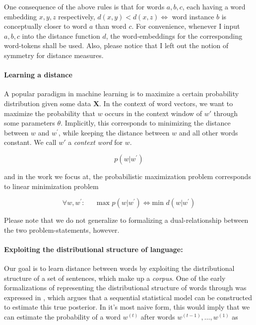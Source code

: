 \documentclass[a4paper,12pt,twoside,openright]{report}
\begin{document}
One consequence of the above rules is that for words $a, b, c$, each having a word embedding $x, y, z$ respectively, $d(x, y) < d(x, z) \iff $ word instance $b$ is conceptually closer to word $a$ than word $c$.
For convenience, whenever I input $a, b, c$ into the distance function $d$, the word-embeddings for the corresponding word-tokens shall be used.
Also, please notice that I left out the notion of symmetry for distance measures.

\paragraph{Learning a distance}
A popular paradigm in machine learning is to maximize a certain probability distribution given some data $\mathbf{X}$.
In the context of word vectors, we want to maximize the probability that $w$ occurs in the context window of $w \prime$ through some parameters $\theta$.
Implicitly, this corresponds to minimizing the distance between $w$ and $w^{\prime}$, while keeping the distance between $w$ and all other words constant. 
We call $w \prime$ a \textit{context word} for $w$.

\begin{equation}
p \left(w | w^{\prime}\right)
\end{equation}

and in the work we focus at, the probabilistic maximization problem corresponds to linear minimization problem

\begin{equation}
\forall w, w^{\prime} : \hspace{20pt} \text{max } p \left(w | w^{\prime}\right) \iff \text{min } d(w | w^{\prime})
\end{equation}

Please note that we do not generalize to formalizing a dual-relationship between the two problem-statements, however.

\paragraph{Exploiting the distributional structure of language:} Our goal is to learn distance between words by exploiting the distributional structure of a set of sentences, which make up a \textit{corpus}. 
One of the early formalizations of representing the distributional structure of words through was expressed in \cite{bengio03}, which argues that a sequential statistical model can be constructed to estimate this true posterior.  
In it's most naive form, this would imply that we can estimate the probability of a word $w^{(t)}$ after words $w^{(t-1)}, \ldots, w^{(1)}$ as
\end{document}
